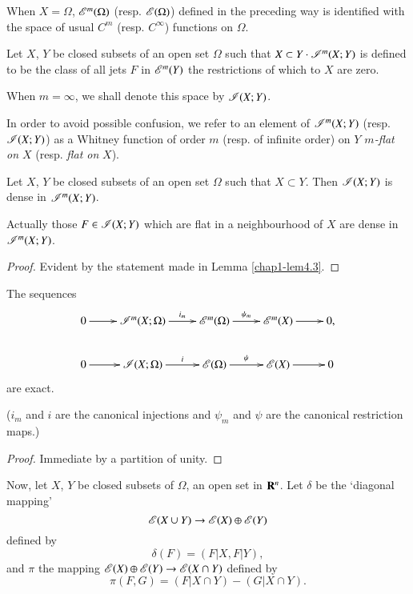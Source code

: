 When $X=\Omega$, $\mathscr{E}^{m}(\Omega)$ (resp. $\mathscr{E}(\Omega)$) defined in the preceding way is identified with the space of usual $C^{m}$ (resp. $C^{\infty}$) functions on $\Omega$.

\begin{definition}\label{chap1-defi5.1}
Let $X$, $Y$ be closed subsets of an open set $\Omega$ such that $X\subset Y\cdot \mathscr{I}^{m}(X;Y)$ is defined to be the class of all jets $F$ in $\mathscr{E}^{m}(Y)$ the restrictions of which to $X$ are zero.

When $m=\infty$, we shall denote this space by $\mathscr{I}(X;Y)$.
\end{definition}

In order to avoid possible confusion, we refer to an element of $\mathscr{I}^{m}(X;Y)$ (resp. $\mathscr{I}(X;Y)$) as a Whitney function of order $m$ (resp. of infinite order) on {\em $Y$ $m$-flat on $X$} (resp. {\em flat on} $X$).

\begin{proposition}\label{chap1-prop5.2}
Let $X$, $Y$ be closed subsets of an open set $\Omega$ such that $X\subset Y$. Then $\mathscr{I}(X;Y)$ is dense in $\mathscr{I}^{m}(X;Y)$.
\end{proposition}

Actually those $F\in \mathscr{I}(X;Y)$ which are flat in a neighbourhood of $X$ are dense in $\mathscr{I}^{m}(X;Y)$.

\begin{proof}
Evident by the statement made in Lemma \ref{chap1-lem4.3}.
\end{proof}

\begin{proposition}\label{chap1-prop5.3}
The sequences
\[
\xymatrix{
0\ar[r] & \scrI^{m}(X;\Omega)\ar[r]^-{i_{m}} & \scrE^{m}(\Omega)\ar[r]^-{\psi_{m}} & \scrE^{m}(X)\ar[r] & 0,\\
0\ar[r] & \scrI(X;\Omega)\ar[r]^-{i} & \scrE(\Omega)\ar[r]^-{\psi} & \scrE(X)\ar[r] & 0
}
\]
are exact.
\end{proposition}

($i_{m}$ and $i$ are the canonical injections and $\psi_{m}$ and $\psi$ are the canonical restriction maps.)

\begin{proof}
Immediate by a partition of unity.
\end{proof}

Now, let $X$, $Y$ be closed subsets of $\Omega$, an open set in $\mathbf{R}^{n}$. Let $\delta$ be the `diagonal mapping'
$$
\mathscr{E}(X\cup Y)\to \mathscr{E}(X)\oplus \mathscr{E}(Y)
$$
defined by
$$
\delta(F)=(F|X,F|Y),
$$
and $\pi$ the mapping $\mathscr{E}(X)\oplus \mathscr{E}(Y)\to \mathscr{E}(X\cap Y)$ defined by
$$
\pi(F,G)=(F|X\cap Y)-(G|X\cap Y).
$$

